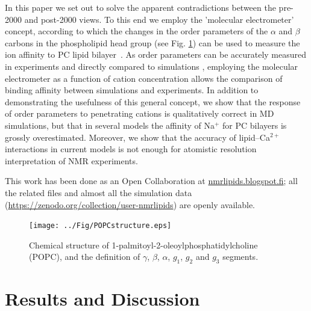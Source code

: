 \documentclass[twoside,twocolumn,9pt]{article}
\begin{document}
In this paper we set out to solve the apparent contradictions
between the pre-2000 and post-2000 views.
To this end we employ the 'molecular electrometer' concept,
according to which the changes in the order parameters of the $\alpha$ and $\beta$ carbons 
in the phospholipid head group (see Fig. \ref{POPCstructure}) can be used to measure the ion affinity to 
PC lipid bilayer~\cite{akutsu81,altenbach84,seelig87,scherer89}.
As order parameters can be accurately measured in experiments and directly compared to 
simulations \cite{ollila16}, employing the molecular electrometer as a function of cation concentration allows the 
comparison of binding affinity between simulations and experiments.
In addition to demonstrating the usefulness of this general concept,
we show that the response of order parameters to penetrating cations
is qualitatively correct in MD simulations, but that in several  models the affinity of Na$^{+}$ for PC bilayers
is grossly overestimated.
Moreover, we show that the accuracy of lipid--Ca$^{2+}$ interactions 
in current models is not enough for atomistic resolution interpretation of NMR experiments. 

This work has been done as an Open Collaboration at \url{nmrlipids.blogspot.fi};
all the related files \cite{githubIONpaper} %
and almost all the simulation data (\url{https://zenodo.org/collection/user-nmrlipids})
are openly available.

\begin{figure}[]
  \centering
  \texttt{[image: ../Fig/POPCstructure.eps]}

  \caption{\label{POPCstructure}
    Chemical structure of 1-palmitoyl-2-oleoylphosphatidylcholine (POPC), and the definition of $\gamma$, $\beta$, $\alpha$, $g_1$, $g_2$ and $g_3$ segments.}
  
\end{figure}


\section{Results and Discussion}
\end{document}
